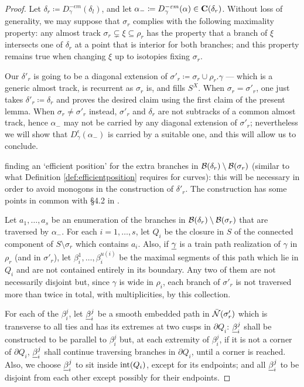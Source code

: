 \begin{proof}
Let $\delta_r\coloneqq D_\gamma^{-\epsilon m}(\delta_l)$, and let $\alpha_-\coloneqq D_{\gamma}^{-\varepsilon m}(\alpha)\in \mathbf C(\delta_r)$. Without loss of generality, we may suppose that $\sigma_r$ complies with the following maximality property: any almost track $\sigma_r\subsetneq \xi\subseteq \rho_r$ has the property that a branch of $\xi$ intersects one of $\delta_r$ at a point that is interior for both branches; and this property remains true when changing $\xi$ up to isotopies fixing $\sigma_r$.

Our $\delta'_r$ is going to be a diagonal extension of $\sigma'_r\coloneqq \sigma_r\cup\rho_r.\gamma$ --- which is a generic almost track, is recurrent as $\sigma_r$ is, and fills $S^X$. When $\sigma_r=\sigma'_r$, one just takes $\delta'_r\coloneqq \delta_r$ and proves the desired claim using the first claim of the present lemma. When $\sigma_r\not=\sigma'_r$ instead, $\sigma'_r$ and $\delta_r$ are not subtracks of a common almost track, hence $\alpha_-$ may not be carried by any diagonal extension of $\sigma'_r$; nevertheless we will show that $D_\gamma^\epsilon(\alpha_-)$ is carried by a suitable one, and this will allow us to conclude.

 finding an `efficient position' for the extra branches in $\mathcal B(\delta_r)\setminus\mathcal B(\sigma_r)$ (similar to what Definition \ref{def:efficientposition} requires for curves): this will be necessary in order to avoid monogons in the construction of $\delta'_r$. The construction has some points in common with \S 4.2 in \cite{mms}.

Let $a_1,\ldots,a_s$ be an enumeration of the branches in $\mathcal B(\delta_r)\setminus\mathcal B(\sigma_r)$ that are traversed by $\alpha_-$. For each $i=1,\ldots,s$, let $Q_i$ be the closure in $S$ of the connected component of $S\setminus \sigma_r$ which contains $a_i$. Also, if $\underline{\gamma}$ is a train path realization of $\gamma$ in $\rho_r$ (and in $\sigma'_r$), let $\beta_i^1,\ldots,\beta_i^{u(i)}$ be the maximal segments of this path which lie in $Q_i$ and are not contained entirely in its boundary. Any two of them are not necessarily disjoint but, since $\gamma$ is wide in $\rho_i$, each branch of $\sigma'_r$ is not traversed more than twice in total, with multiplicities, by this collection.

For each of the $\beta_i^j$, let $\underline{\beta}_i^j$ be a smooth embedded path in $\bar{{\mathcal N}}(\sigma'_r)$ which is transverse to all ties and has its extremes at two cusps in $\partial Q_i$: $\underline{\beta}_i^j$ shall be constructed to be parallel to $\beta_i^j$ but, at each extremity of $\beta_i^j$, if it is not a corner of $\partial Q_i$, $\underline{\beta}_i^j$ shall continue traversing branches in $\partial Q_i$, until a corner is reached. Also, we choose $\underline{\beta}_i^j$ to sit inside $\mathrm{int}(Q_i)$, except for its endpoints; and all $\underline{\beta}_i^j$ to be disjoint from each other except possibly for their endpoints.


\end{proof}
